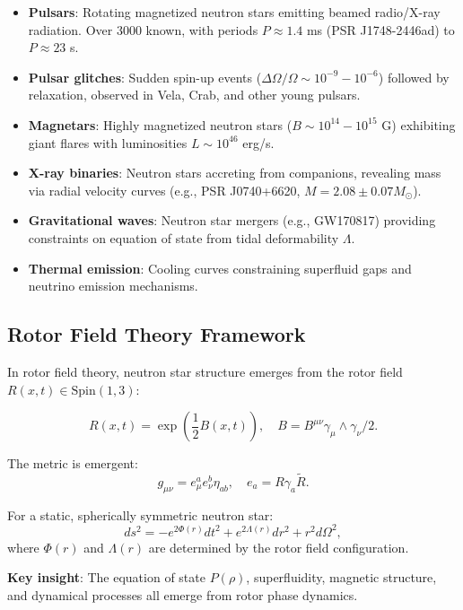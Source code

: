 \documentclass[12pt,a4paper]{article}
\theoremstyle{definition}
\theoremstyle{remark}
\begin{document}
\begin{itemize}
\item \textbf{Pulsars}: Rotating magnetized neutron stars emitting beamed radio/X-ray radiation. Over 3000 known, with periods $P \approx 1.4$ ms (PSR J1748-2446ad) to $P \approx 23$ s.
\item \textbf{Pulsar glitches}: Sudden spin-up events ($\Delta \Omega/\Omega \sim 10^{-9}-10^{-6}$) followed by relaxation, observed in Vela, Crab, and other young pulsars.
\item \textbf{Magnetars}: Highly magnetized neutron stars ($B \sim 10^{14}-10^{15}$ G) exhibiting giant flares with luminosities $L \sim 10^{46}$ erg/s.
\item \textbf{X-ray binaries}: Neutron stars accreting from companions, revealing mass via radial velocity curves (e.g., PSR J0740+6620, $M = 2.08 \pm 0.07 M_\odot$).
\item \textbf{Gravitational waves}: Neutron star mergers (e.g., GW170817) providing constraints on equation of state from tidal deformability $\Lambda$.
\item \textbf{Thermal emission}: Cooling curves constraining superfluid gaps and neutrino emission mechanisms.
\end{itemize}

\subsection{Rotor Field Theory Framework}

In rotor field theory, neutron star structure emerges from the rotor field $R(x,t) \in \mathrm{Spin}(1,3)$:

\begin{equation}
R(x,t) = \exp\left(\frac{1}{2} B(x,t)\right), \quad B = B^{\mu\nu} \gamma_\mu \wedge \gamma_\nu / 2.
\end{equation}

The metric is emergent:
\begin{equation}
g_{\mu\nu} = e_\mu^a e_\nu^b \eta_{ab}, \quad e_a = R \gamma_a \tilde{R}.
\end{equation}

For a static, spherically symmetric neutron star:
\begin{equation}
ds^2 = -e^{2\Phi(r)} dt^2 + e^{2\Lambda(r)} dr^2 + r^2 d\Omega^2,
\end{equation}
where $\Phi(r)$ and $\Lambda(r)$ are determined by the rotor field configuration.

\textbf{Key insight}: The equation of state $P(\rho)$, superfluidity, magnetic structure, and dynamical processes all emerge from rotor phase dynamics.
\end{document}

